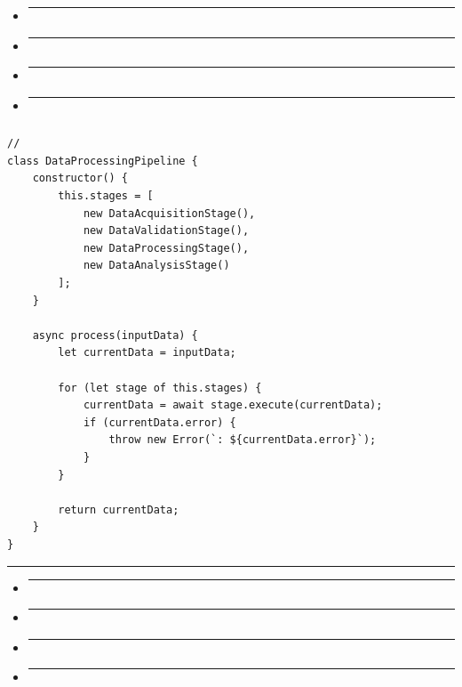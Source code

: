 \begin{itemize}
\item
  \begin{center}\rule{0.5\linewidth}{0.5pt}\end{center}
\item
  \begin{center}\rule{0.5\linewidth}{0.5pt}\end{center}
\item
  \begin{center}\rule{0.5\linewidth}{0.5pt}\end{center}
\item
  \begin{center}\rule{0.5\linewidth}{0.5pt}\end{center}
\end{itemize}

\subsubsection{}\label{section-6}

\begin{verbatim}
// 
class DataProcessingPipeline {
    constructor() {
        this.stages = [
            new DataAcquisitionStage(),
            new DataValidationStage(),
            new DataProcessingStage(),
            new DataAnalysisStage()
        ];
    }
    
    async process(inputData) {
        let currentData = inputData;
        
        for (let stage of this.stages) {
            currentData = await stage.execute(currentData);
            if (currentData.error) {
                throw new Error(`: ${currentData.error}`);
            }
        }
        
        return currentData;
    }
}
\end{verbatim}

\begin{center}\rule{0.5\linewidth}{0.5pt}\end{center}

\begin{itemize}
\item
  \begin{center}\rule{0.5\linewidth}{0.5pt}\end{center}
\item
  \begin{center}\rule{0.5\linewidth}{0.5pt}\end{center}
\item
  \begin{center}\rule{0.5\linewidth}{0.5pt}\end{center}
\item
  \begin{center}\rule{0.5\linewidth}{0.5pt}\end{center}

  \subsection{}\label{section-7}
\end{itemize}

